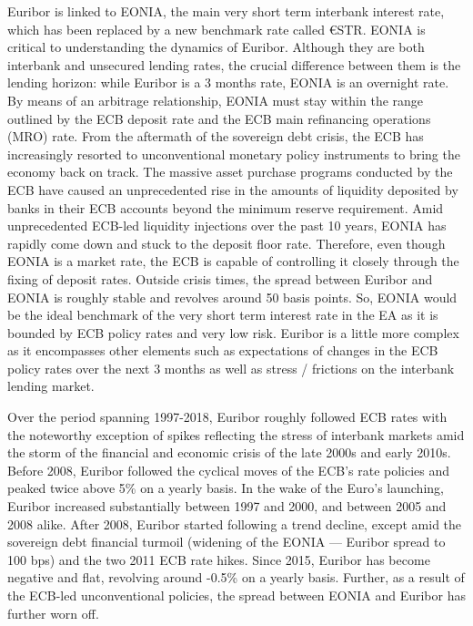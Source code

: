 \documentclass[
  11pt,
]{article}
\begin{document}
Euribor is linked to EONIA, the main very short term interbank interest rate, which has been replaced by a new benchmark rate called €STR. EONIA is critical to understanding the dynamics of Euribor. Although they are both interbank and unsecured lending rates, the crucial difference between them is the lending horizon: while Euribor is a 3 months rate, EONIA is an overnight rate. By means of an arbitrage relationship, EONIA must stay within the range outlined by the ECB deposit rate and the ECB main refinancing operations (MRO) rate. From the aftermath of the sovereign debt crisis, the ECB has increasingly resorted to unconventional monetary policy instruments to bring the economy back on track. The massive asset purchase programs conducted by the ECB have caused an unprecedented rise in the amounts of liquidity deposited by banks in their ECB accounts beyond the minimum reserve requirement. Amid unprecedented ECB-led liquidity injections over the past 10 years, EONIA has rapidly come down and stuck to the deposit floor rate. Therefore, even though EONIA is a market rate, the ECB is capable of controlling it closely through the fixing of deposit rates. Outside crisis times, the spread between Euribor and EONIA is roughly stable and revolves around 50 basis points. So, EONIA would be the ideal benchmark of the very short term interest rate in the EA as it is bounded by ECB policy rates and very low risk. Euribor is a little more complex as it encompasses other elements such as expectations of changes in the ECB policy rates over the next 3 months as well as stress / frictions on the interbank lending market.

Over the period spanning 1997-2018, Euribor roughly followed ECB rates with the noteworthy exception of spikes reflecting the stress of interbank markets amid the storm of the financial and economic crisis of the late 2000s and early 2010s. Before 2008, Euribor followed the cyclical moves of the ECB's rate policies and peaked twice above 5\% on a yearly basis. In the wake of the Euro's launching, Euribor increased substantially between 1997 and 2000, and between 2005 and 2008 alike. After 2008, Euribor started following a trend decline, except amid the sovereign debt financial turmoil (widening of the EONIA --- Euribor spread to 100 bps) and the two 2011 ECB rate hikes. Since 2015, Euribor has become negative and flat, revolving around -0.5\% on a yearly basis. Further, as a result of the ECB-led unconventional policies, the spread between EONIA and Euribor has further worn off.
\end{document}
